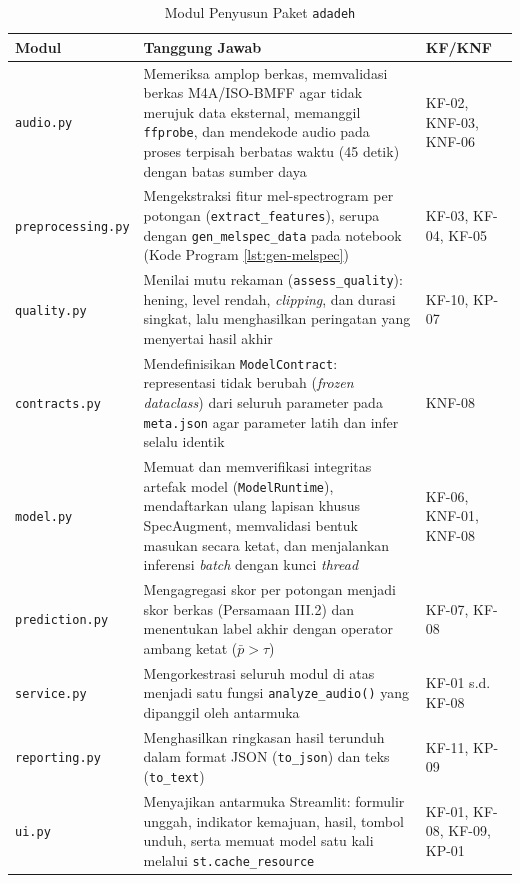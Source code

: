 \begin{table}[htbp]
  \centering
  \caption{Modul Penyusun Paket \texttt{adadeh}}
  \label{tab:modul-pemrosesan}
  \begin{tabular}{@{}p{3.1cm}p{6.8cm}p{2.1cm}@{}}
    \toprule
    \textbf{Modul} & \textbf{Tanggung Jawab} & \textbf{KF/KNF} \\
    \midrule
    \texttt{audio.py} & Memeriksa amplop berkas, memvalidasi berkas M4A/ISO-BMFF agar
    tidak merujuk data eksternal, memanggil \texttt{ffprobe}, dan mendekode audio pada
    proses terpisah berbatas waktu (45 detik) dengan batas sumber daya & KF-02, KNF-03,
    KNF-06 \\
    \texttt{preprocessing.py} & Mengekstraksi fitur mel-spectrogram per potongan
    (\texttt{extract\_features}), serupa dengan \texttt{gen\_melspec\_data} pada
    notebook (Kode Program \ref{lst:gen-melspec}) & KF-03, KF-04, KF-05 \\
    \texttt{quality.py} & Menilai mutu rekaman (\texttt{assess\_quality}): hening,
    level rendah, \textit{clipping}, dan durasi singkat, lalu menghasilkan peringatan
    yang menyertai hasil akhir & KF-10, KP-07 \\
    \texttt{contracts.py} & Mendefinisikan \texttt{ModelContract}: representasi tidak
    berubah (\textit{frozen dataclass}) dari seluruh parameter pada \texttt{meta.json}
    agar parameter latih dan infer selalu identik & KNF-08 \\
    \texttt{model.py} & Memuat dan memverifikasi integritas artefak model
    (\texttt{ModelRuntime}), mendaftarkan ulang lapisan khusus SpecAugment, memvalidasi
    bentuk masukan secara ketat, dan menjalankan inferensi \textit{batch} dengan kunci
    \textit{thread} & KF-06, KNF-01, KNF-08 \\
    \texttt{prediction.py} & Mengagregasi skor per potongan menjadi skor berkas
    (Persamaan III.2) dan menentukan label akhir dengan operator ambang ketat
    ($\bar{p} > \tau$) & KF-07, KF-08 \\
    \texttt{service.py} & Mengorkestrasi seluruh modul di atas menjadi satu fungsi
    \texttt{analyze\_audio()} yang dipanggil oleh antarmuka & KF-01 s.d. KF-08 \\
    \texttt{reporting.py} & Menghasilkan ringkasan hasil terunduh dalam format JSON
    (\texttt{to\_json}) dan teks (\texttt{to\_text}) & KF-11, KP-09 \\
    \texttt{ui.py} & Menyajikan antarmuka Streamlit: formulir unggah, indikator
    kemajuan, hasil, tombol unduh, serta memuat model satu kali melalui
    \texttt{st.cache\_resource} & KF-01, KF-08, KF-09, KP-01 \\
    \bottomrule
  \end{tabular}
\end{table}

